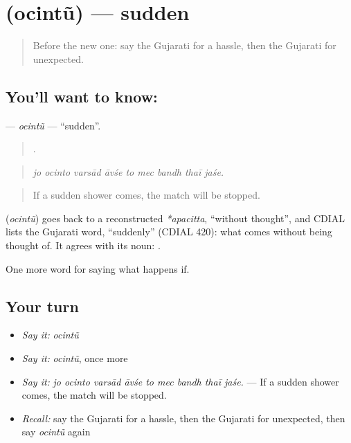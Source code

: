 \section[\texorpdfstring{\gu{ઓચિંતું} (ocintũ)}{ઓચિંતું (ocintũ)}]{ (ocintũ) — sudden}

\label{lesson:GU-C531-ocintu}



\begin{quote}
Before the new one: say the Gujarati for a hassle, then the Gujarati for unexpected.
\end{quote}

\subsection*{You'll want to know: }
\textbf{} — \emph{ocintũ} — \textquotedblleft{}sudden\textquotedblright{}.

\begin{quote}
        .
\end{quote}

\begin{quote}
\emph{jo ocinto varsād āvśe to mec bandh thaī jaśe.}
\end{quote}

\begin{quote}
If a sudden shower comes, the match will be stopped.
\end{quote}

\begin{cousinweb}
\textbf{} (\emph{ocintũ}) goes back to a reconstructed \emph{*apacitta}, \textquotedblleft{}without thought\textquotedblright{}, and CDIAL lists the Gujarati word, \textquotedblleft{}suddenly\textquotedblright{} (CDIAL 420): what comes without being thought of. It agrees with its noun: \textbf{ }.
\end{cousinweb}

\begin{grammarlens}[title={What you've built}]
One more word for saying what happens if.
\end{grammarlens}

\subsection*{Your turn}
\begin{itemize}
\raggedright
  \item \emph{Say it:} \emph{ocintũ}
  \item \emph{Say it:} \emph{ocintũ}, once more
  \item \emph{Say it:} \emph{jo ocinto varsād āvśe to mec bandh thaī jaśe.} — If a sudden shower comes, the match will be stopped.
  \item \emph{Recall:} say the Gujarati for a hassle, then the Gujarati for unexpected, then say \emph{ocintũ} again
\end{itemize}

